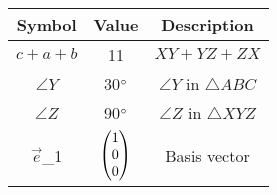  \begin{tabular}{|c|c|c|} 
  \hline 
  \textbf{Symbol}&\textbf{Value}&\textbf{Description}\\ 
  \hline 
  $c+a+b$ & 11 & $XY+YZ+ZX$ \\ 
  \hline 
 $\angle{Y}$ & 30$\degree{}$ & $\angle{Y}$ in $\triangle$$ABC$\\ 
  \hline 
        $\angle{Z}$ & 90$\degree{}$ & $\angle{Z}$ in $\triangle$$XYZ$ \\
   
  \hline  
	 $\vec{e}$_1 & $\begin{pmatrix} 
   1 \\
   0 \\
   0 
   \end{pmatrix}$ & Basis vector\\ 
 \hline
 \end{tabular}\\	
